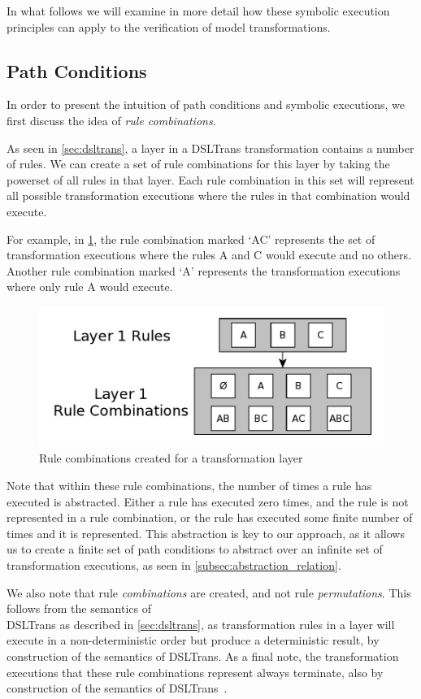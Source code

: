 In what follows we will examine in more detail how these symbolic execution
principles can apply to the verification of model transformations.


\subsection{Path Conditions}
\label{sec:gen_path_conds}

In order to present the intuition of path conditions and symbolic executions, we
first discuss the idea of \textit{rule combinations}.

As seen in \cref{sec:dsltrans}, a layer in a DSLTrans transformation contains a
number of rules.  We can create a set of rule combinations for this layer by
taking the powerset of all rules in that layer. Each rule combination in this
set will represent all possible transformation executions where the rules in
that combination would execute.

For example, in \cref{fig:rule_combos2}, the rule combination marked `AC'
represents the set of transformation executions where the rules A and C would
execute and no others. Another rule combination marked `A' represents the
transformation executions where only rule A would execute.

\begin{figure}[h!] \centering \includegraphics[width=.40\textwidth]{./figures/overview/rule_combos.pdf}
	\caption{Rule combinations created for a transformation layer}
	\label{fig:rule_combos2}
\end{figure}

Note that within these rule combinations, the number of times a rule has
executed is abstracted. Either a rule has executed zero times, and the rule is
not represented in a rule combination, or the rule has executed some finite
number of times and it is represented. This abstraction is key to our approach,
as it allows us to create a finite set of path conditions to abstract over an
infinite set of transformation executions, as seen in
\cref{subsec:abstraction_relation}.

We also note that rule \textit{combinations} are created, and not rule
\textit{permutations}. This follows from the semantics of \\DSLTrans as described
in \cref{sec:dsltrans}, as transformation rules in a layer will execute in a
non-deterministic order but produce a deterministic result, by construction of the semantics of DSLTrans. As a final
note, the transformation executions that these rule combinations represent always terminate, also by construction of the semantics of DSLTrans~\cite{DBLP:conf/sle/BarrocaLAFS10}.

